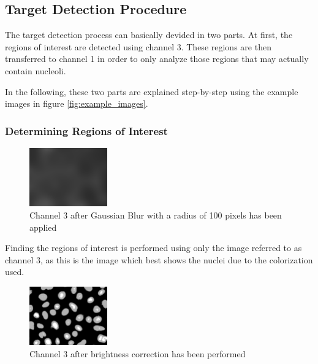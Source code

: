 \documentclass[a4paper, 11pt]{article}
\begin{document}
\subsection{Target Detection Procedure}
The target detection process can basically devided in two parts. At first, the
regions of interest are detected using channel 3. These regions are then
transferred to channel 1 in order to only analyze those regions that may
actually contain nucleoli.

In the following, these two parts are explained step-by-step using the example
images in figure \ref{fig:example_images}.


\subsubsection{Determining Regions of Interest}
\begin{figure}
\vspace{-20pt}
\includegraphics[width=0.3\textwidth]{images/example_Kanal3_gaussian100}
\caption{Channel 3 after Gaussian Blur with a radius of 100 pixels has been
applied}
\label{fig:example_channel3_gaussian}
\vspace{-12pt}
\end{figure}

Finding the regions of interest is performed using only the image referred to as
channel 3, as this is the image which best shows the nuclei due to the
colorization used.

\begin{figure}
\vspace{-12pt}
\includegraphics[width=0.3\textwidth]{images/example_Kanal3_multiply178_gaussian2}
\caption{Channel 3 after brightness correction has been performed}
\label{fig:example_channel3_prepared}
\end{figure}
\end{document}
